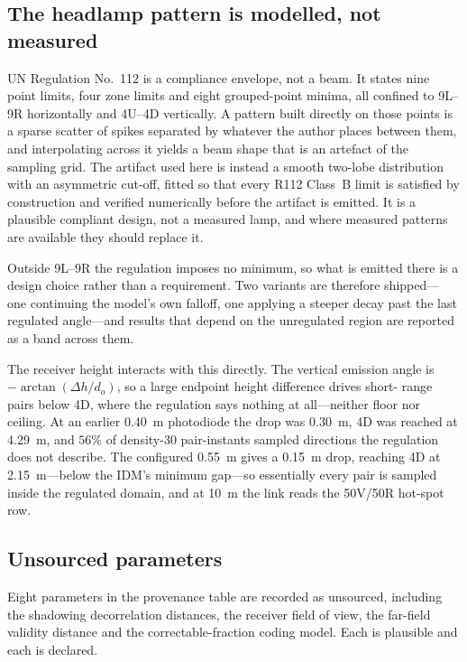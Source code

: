 \documentclass[conference]{IEEEtran}
\begin{document}
\subsection{The headlamp pattern is modelled, not measured}

UN Regulation No.~112 is a compliance envelope, not a beam. It states nine
point limits, four zone limits and eight grouped-point minima, all confined to
9L--9R horizontally and 4U--4D vertically. A pattern built directly on those
points is a sparse scatter of spikes separated by whatever the author places
between them, and interpolating across it yields a beam shape that is an
artefact of the sampling grid. The artifact used here is instead a smooth
two-lobe distribution with an asymmetric cut-off, fitted so that every R112
Class~B limit is satisfied by construction and verified numerically before the
artifact is emitted. It is a plausible compliant design, not a measured lamp,
and where measured patterns are available \cite{alsalami2021,memedi2018} they
should replace it.

Outside 9L--9R the regulation imposes no minimum, so what is emitted there is a
design choice rather than a requirement. Two variants are therefore shipped---
one continuing the model's own falloff, one applying a steeper decay past the
last regulated angle---and results that depend on the unregulated region are
reported as a band across them.

The receiver height interacts with this directly. The vertical emission angle
is $-\arctan(\Delta h/d_o)$, so a large endpoint height difference drives short-
range pairs below 4D, where the regulation says nothing at all---neither floor
nor ceiling. At an earlier \SI{0.40}{\meter} photodiode the drop was
\SI{0.30}{\meter}, 4D was reached at \SI{4.29}{\meter}, and $56\%$ of
density-30 pair-instants sampled directions the regulation does not describe.
The configured \SI{0.55}{\meter} gives a \SI{0.15}{\meter} drop, reaching 4D at
\SI{2.15}{\meter}---below the IDM's minimum gap---so essentially every pair is
sampled inside the regulated domain, and at \SI{10}{\meter} the link reads the
50V/50R hot-spot row.

\subsection{Unsourced parameters}

Eight parameters in the provenance table are recorded as unsourced, including
the shadowing decorrelation distances, the receiver field of view, the
far-field validity distance and the correctable-fraction coding model. Each is
plausible and each is declared.
\end{document}
